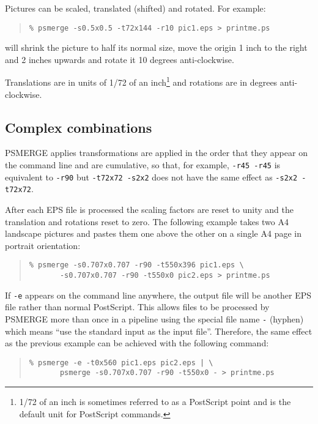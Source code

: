 \documentclass[twoside,11pt]{article}
\newcommand{\xlabel}[1]{}
\begin{document}
Pictures can be scaled, translated (shifted) and rotated. For example:

\begin{quote}\begin{verbatim}
% psmerge -s0.5x0.5 -t72x144 -r10 pic1.eps > printme.ps
\end{verbatim}\end{quote}

will shrink the picture to half its normal size, move the origin 1 inch to the
right and 2 inches upwards and rotate it 10 degrees anti-clockwise.  

Translations are in units of 1/72 of an inch\footnote{1/72 of an inch
is sometimes referred to as a PostScript point and is the default unit
for PostScript commands.} and rotations are in degrees anti-clockwise.

\subsection{\xlabel{complex_combinations}Complex combinations}

PSMERGE applies transformations are applied in the order that they
appear on the command line and are cumulative, so that, for example,
\texttt{-r45~-r45} is equivalent to \texttt{-r90} but
\texttt{-t72x72~-s2x2} does not have the same effect as
\texttt{-s2x2~-t72x72}.

After each EPS file is processed the scaling factors are reset to unity
and the translation and rotations reset to zero.  The following example
takes two A4 landscape pictures and pastes them one above the other on
a single A4 page in portrait orientation:

\begin{quote}\begin{verbatim}
% psmerge -s0.707x0.707 -r90 -t550x396 pic1.eps \
       -s0.707x0.707 -r90 -t550x0 pic2.eps > printme.ps
\end{verbatim}\end{quote}

If \texttt{-e} appears on the command line anywhere, the output file
will be another EPS file rather than normal PostScript.  This allows
files to be processed by PSMERGE more than once in a pipeline using the
special file name \texttt{-} (hyphen) which means ``use the standard
input as the input file''.  Therefore, the same effect as the previous
example can be achieved with the following command:

\begin{quote}\begin{verbatim}
% psmerge -e -t0x560 pic1.eps pic2.eps | \
       psmerge -s0.707x0.707 -r90 -t550x0 - > printme.ps
\end{verbatim}\end{quote}
\end{document}
